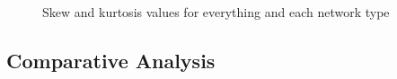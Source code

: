 \documentclass[
  letterpaper,
  DIV=11,
  numbers=noendperiod,
  oneside]{scrartcl}
\begin{document}
\begin{figure}
\begin{minipage}[t]{0.50\linewidth}
{{}

}

\end{minipage}%
%
\begin{minipage}[t]{0.50\linewidth}

{\centering 


}

\end{minipage}%
\newline
\begin{minipage}[t]{0.50\linewidth}

{\centering 


}

\end{minipage}%

\caption{\label{fig-colskews}Skew and kurtosis values for everything and
each network type}

\end{figure}

\hypertarget{comparative-analysis}{%
\subsection{Comparative Analysis}\label{comparative-analysis}}
\end{document}
